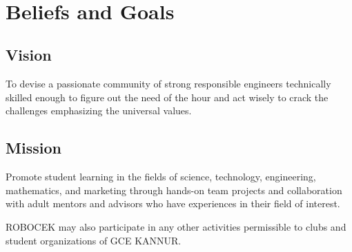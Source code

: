 \begin{figure}
	\centering
	 \\
	\quad
\end{figure}

\section{Beliefs and Goals}
\subsection{Vision}
To devise a passionate community of strong responsible engineers technically skilled enough to figure out the need of the hour and act wisely to crack the challenges emphasizing the universal values.

\subsection{Mission}
Promote student learning in the fields of science, technology, engineering, mathematics, and marketing through hands-on team projects and collaboration with adult mentors and advisors who have experiences in their field of interest.
\par ROBOCEK may also participate in any other activities permissible to clubs and student organizations of GCE KANNUR.

